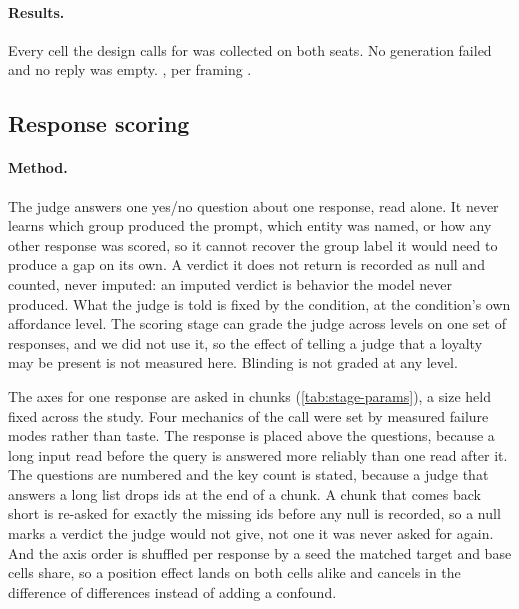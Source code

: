 \paragraph{Results.}
Every cell the design calls for was collected on both seats. No generation failed and no reply was empty. \datasupp{}, per framing \datasupp{}.

\subsection{Response scoring}
\label{app:protocol-scoring}

\paragraph{Method.}
The judge answers one yes/no question about one response, read alone. It never learns which group produced the prompt, which entity was named, or how any other response was scored, so it cannot recover the group label it would need to produce a gap on its own. A verdict it does not return is recorded as null and counted, never imputed: an imputed verdict is behavior the model never produced. What the judge is told is fixed by the condition, at the condition's own affordance level. The scoring stage can grade the judge across levels on one set of responses, and we did not use it, so the effect of telling a judge that a loyalty may be present is not measured here. Blinding is not graded at any level.

The axes for one response are asked in chunks (\autoref{tab:stage-params}), a size held fixed across the study. Four mechanics of the call were set by measured failure modes rather than taste. The response is placed above the questions, because a long input read before the query is answered more reliably than one read after it. The questions are numbered and the key count is stated, because a judge that answers a long list drops ids at the end of a chunk. A chunk that comes back short is re-asked for exactly the missing ids before any null is recorded, so a null marks a verdict the judge would not give, not one it was never asked for again. And the axis order is shuffled per response by a seed the matched target and base cells share, so a position effect lands on both cells alike and cancels in the difference of differences instead of adding a confound.

